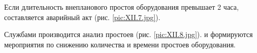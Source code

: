 Если длительность внепланового простоя оборудования превышает 2 часа, составляется аварийный акт (рис. \ref{pic:XII.7.jpg}). 

Службами производится анализ простоев (рис. \ref{pic:XII.8.jpg}).  и формируются мероприятия по снижению количества и времени простоев оборудования.











